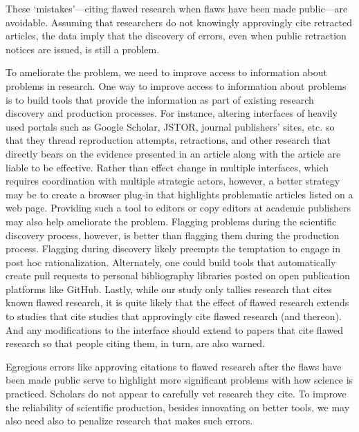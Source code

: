\documentclass[12pt, letterpaper]{article}
\begin{document}
These `mistakes'---citing flawed research when flaws have been made public---are avoidable. Assuming that researchers do not knowingly approvingly cite retracted articles, the data imply that the discovery of errors, even when public retraction notices are issued, is still a problem. 

To ameliorate the problem, we need to improve access to information about problems in research. One way to improve access to information about problems is to build tools that provide the information as part of existing research discovery and production processes. For instance, altering interfaces of heavily used portals such as Google Scholar, JSTOR, journal publishers' sites, etc. so that they thread reproduction attempts, retractions, and other research that directly bears on the evidence presented in an article along with the article are liable to be effective. Rather than effect change in multiple interfaces, which requires coordination with multiple strategic actors, however, a better strategy may be to create a browser plug-in that highlights problematic articles listed on a web page. Providing such a tool to editors or copy editors at academic publishers may also help ameliorate the problem. Flagging problems during the scientific discovery process, however, is better than flagging them during the production process. Flagging during discovery likely preempts the temptation to engage in post hoc rationalization. Alternately, one could build tools that automatically create pull requests to personal bibliography libraries posted on open publication platforms like GitHub. Lastly, while our study only tallies research that cites known flawed research, it is quite likely that the effect of flawed research extends to studies that cite studies that approvingly cite flawed research (and thereon).  And any modifications to the interface should extend to papers that cite flawed research so that people citing them, in turn, are also warned. 

Egregious errors like approving citations to flawed research after the flaws have been made public serve to highlight more significant problems with how science is practiced. Scholars do not appear to carefully vet research they cite. To improve the reliability of scientific production, besides innovating on better tools, we may also need also to penalize research that makes such errors.

  

\clearpage


\end{document}
